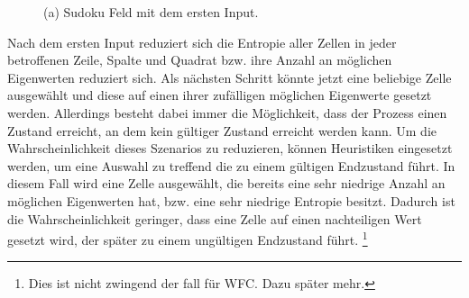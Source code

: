 \documentclass[12pt, a4paper,twoside,openright]{report} %
\begin{document}
\begin{figure}[H]
    \centering
    \caption{(a) Sudoku Feld mit dem ersten Input.}%
\end{figure}

Nach dem ersten Input reduziert sich die Entropie aller Zellen in jeder betroffenen Zeile,
Spalte und Quadrat bzw. ihre Anzahl an möglichen Eigenwerten reduziert sich.
Als nächsten Schritt könnte jetzt eine beliebige Zelle ausgewählt und diese auf einen ihrer zufälligen möglichen Eigenwerte gesetzt werden.
Allerdings besteht dabei immer die Möglichkeit, dass der Prozess einen Zustand erreicht, an dem kein gültiger Zustand erreicht werden kann.
Um die Wahrscheinlichkeit dieses Szenarios zu reduzieren, können Heuristiken eingesetzt werden,
um eine Auswahl zu treffend die zu einem gültigen Endzustand führt.
In diesem Fall wird eine Zelle ausgewählt, die bereits eine sehr niedrige Anzahl an möglichen Eigenwerten hat, bzw. eine sehr niedrige Entropie besitzt.
Dadurch ist die Wahrscheinlichkeit geringer, dass eine Zelle auf einen nachteiligen Wert gesetzt wird, der später zu einem ungültigen Endzustand führt.
\footnote[2]{Dies ist nicht zwingend der fall für WFC. Dazu später mehr.}
\end{document}

